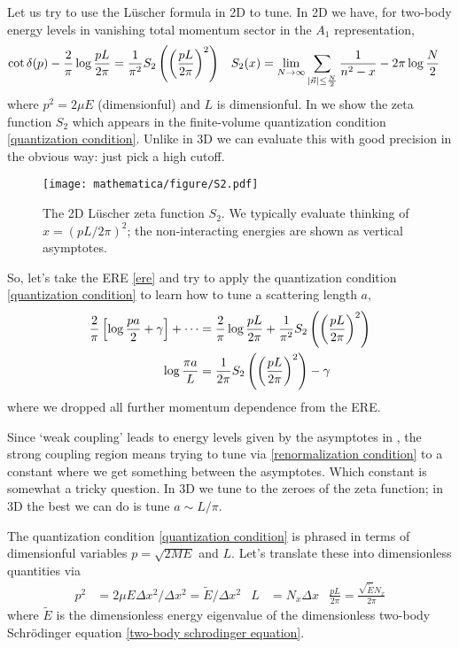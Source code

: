 Let us try to use the L\"{u}scher formula in 2D \cite{Zhu:2019dho,Korber:2019cuq} to tune.
In 2D we have, for two-body energy levels in vanishing total momentum sector in the $A_1$ representation,
\begin{align}
	\cot \delta(p) - \frac{2}{\pi} \log \frac{pL}{2\pi} &= \frac{1}{\pi^2} S_2\left(\left(\frac{pL}{2\pi}\right)^2\right)
	&	
	S_2(x) &= \lim_{N\rightarrow\infty} \sum_{\left| \vec{n} \right| \leq \frac{N}{2}} \frac{1}{n^2-x} - 2\pi \log \frac{N}{2}
	\label{eq:quantization condition}
\end{align}
where $p^2=2\mu E$ (dimensionful) and $L$ is dimensionful.
In  we show the zeta function $S_2$ which appears in the finite-volume quantization condition \eqref{quantization condition}.
Unlike in 3D we can evaluate this with good precision in the obvious way: just pick a high cutoff.
\begin{figure}
	\texttt{[image: mathematica/figure/S2.pdf]}
	\caption{The 2D L\"{u}scher zeta function $S_2$.  We typically evaluate thinking of $x = (pL/2\pi)^2$; the non-interacting energies are shown as vertical asymptotes.}
	\label{fig:S2}
\end{figure}

So, let's take the ERE \eqref{ere} and try to apply the quantization condition \eqref{quantization condition} to learn how to tune a scattering length $a$,
\begin{align}
	\frac{2}{\pi} \left[\log\frac{pa}{2} + \gamma \right] + \cdots
	&=
	\frac{2}{\pi} \log \frac{pL}{2\pi} + \frac{1}{\pi^2} S_2\left(\left(\frac{pL}{2\pi}\right)^2\right)
	\\
	\log \frac{\pi a}{L} &= \frac{1}{2\pi} S_2\left(\left(\frac{pL}{2\pi}\right)^2\right) - \gamma
	\label{eq:renormalization condition}
\end{align}
where we dropped all further momentum dependence from the ERE.

Since `weak coupling' leads to energy levels given by the asymptotes in , the strong coupling region means trying to tune via \eqref{renormalization condition} to a constant where we get something between the asymptotes.
Which constant is somewhat a tricky question.
In 3D we tune to the zeroes of the zeta function; in 3D the best we can do is tune $a \sim L/\pi$.

The quantization condition \eqref{quantization condition} is phrased in terms of dimensionful variables $p=\sqrt{2ME}$ and $L$.
Let's translate these into dimensionless quantities via
\begin{align}
    p^2 &= 2 \mu  E \Delta x^2 / \Delta x^2 = \tilde{E} / \Delta x^2
	&
	L &= N_x \Delta x
    &
    \frac{pL}{2\pi} = \frac{\sqrt{\tilde{E}} N_x}{2\pi}
\end{align}
where $\tilde{E}$ is the dimensionless energy eigenvalue of the dimensionless two-body Schr\"{o}dinger equation \eqref{two-body schrodinger equation}.

